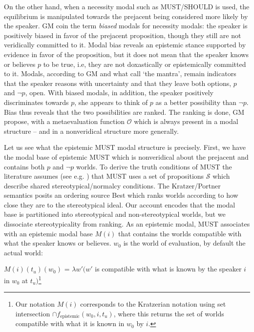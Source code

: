 \documentclass[output=paper,colorlinks,citecolor=brown]{langscibook}
\begin{document}
 

On the other hand, when a necessity modal such as \textsc{MUST}/\textsc{SHOULD}  is used, the equilibrium is manipulated towards the prejacent being considered more likely by the speaker. GM coin the term \textit{biased} modals for necessity modals: the speaker is positively biased in favor of the prejacent proposition, though they still are not veridically committed to it. Modal bias reveals an epistemic stance supported by evidence in favor of the proposition, but it does not mean that the speaker knows or believes $p$ to be true, i.e, they are not doxastically or epistemically committed to it. Modals, according to GM and what \citet{von2010} call `the mantra',  remain indicators that the speaker reasons with uncertainty and that they leave both options, $p$ and $\neg p$, open. With biased modals, in addition, the speaker positively discriminates towards $p$, she appears to think of $p$ as a better possibility than $\neg p$. Bias thus reveals that  the two possibilities are ranked. The ranking is done, GM propose, with a metaevaluation function $\mathcal{O}$ which is always present in a modal structure --  and  in a nonveridical structure more generally.

\largerpage
Let us see what the epistemic \textsc{MUST} modal structure is precisely. First, we have the  modal base of epistemic \textsc{MUST} which is nonveridical about the prejacent and contains both $p$ and $\neg p$ worlds.  To derive the truth conditions of \textsc{MUST} the literature assumes (see e.g. \citealt{kratzer1991, portner2009, giannakidoumari2016, giannakidoumari2018b, giannakidoumari2021a, giannakidoumari2021b}) that \textsc{MUST} uses a set of propositions ${\mathcal{S}}$ which describe shared stereotypical/normalcy conditions.  The Kratzer/Portner semantics posits an ordering source Best which ranks worlds according to how close they are to the stereotypical ideal. Our account encodes that the modal base is partitioned into stereotypical and non-stereotypical worlds, but we dissociate stereotypicality from ranking. 
 As an epistemic modal, \textsc{MUST} associates with an epistemic modal base $M(i)$ that contains the worlds compatible with what the speaker knows or believes. $w_0$ is the  world of evaluation, by default the actual world:

\ea $M(i)(t_u)(w_0)$  = $\lambda w' (w'$ is compatible with what is known by the speaker $i$ in $w_0$ at $t_u)$\footnote{Our notation $M(i)$ corresponds to the Kratzerian  notation using set intersection $\cap f_{\text{epistemic}}(w_0,i,t_u)$, where this returns the set of worlds compatible with what it is known in $w_0$ by  $i$.}
\z
\end{document}
